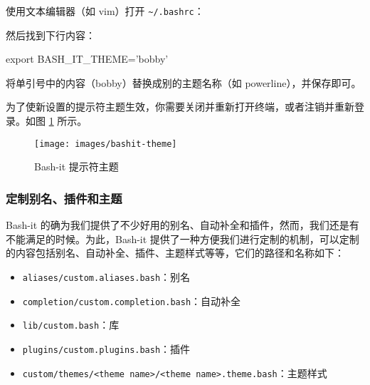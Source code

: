 \documentclass[]{ctexbook}
\newenvironment{Shaded}{\begin{snugshade}}{\end{snugshade}}
\newcommand{\BuiltInTok}[1]{#1}
\newcommand{\ExtensionTok}[1]{#1}
\newcommand{\NormalTok}[1]{#1}
\newcommand{\StringTok}[1]{\textcolor[rgb]{0.31,0.60,0.02}{#1}}
\newcommand{\VariableTok}[1]{\textcolor[rgb]{0.00,0.00,0.00}{#1}}
\providecommand{\tightlist}{%
  \setlength{\itemsep}{0pt}\setlength{\parskip}{0pt}}
\begin{document}
使用文本编辑器（如 vim）打开 \texttt{\textasciitilde{}/.bashrc}：

\begin{Shaded}
\end{Shaded}

然后找到下行内容：

\begin{Shaded}
\begin{Highlighting}[]
\BuiltInTok{export} \VariableTok{BASH_IT_THEME=}\StringTok{'bobby'}
\end{Highlighting}
\end{Shaded}

将单引号中的内容（bobby）替换成别的主题名称（如 powerline），并保存即可。

为了使新设置的提示符主题生效，你需要关闭并重新打开终端，或者注销并重新登录。如图 \ref{fig:bashit-theme} 所示。

\begin{figure}
\texttt{[image: images/bashit-theme]} \caption{Bash-it 提示符主题}\label{fig:bashit-theme}
\end{figure}

\hypertarget{ux5b9aux5236ux522bux540dux63d2ux4ef6ux548cux4e3bux9898}{%
\subsubsection{定制别名、插件和主题}\label{ux5b9aux5236ux522bux540dux63d2ux4ef6ux548cux4e3bux9898}}

Bash-it 的确为我们提供了不少好用的别名、自动补全和插件，然而，我们还是有不能满足的时候。为此，Bash-it 提供了一种方便我们进行定制的机制，可以定制的内容包括别名、自动补全、插件、主题样式等等，它们的路径和名称如下：

\begin{itemize}
\tightlist
\item
  \texttt{aliases/custom.aliases.bash}：别名
\item
  \texttt{completion/custom.completion.bash}：自动补全
\item
  \texttt{lib/custom.bash}：库
\item
  \texttt{plugins/custom.plugins.bash}：插件
\item
  \texttt{custom/themes/\textless{}theme\ name\textgreater{}/\textless{}theme\ name\textgreater{}.theme.bash}：主题样式
\end{itemize}
\end{document}
